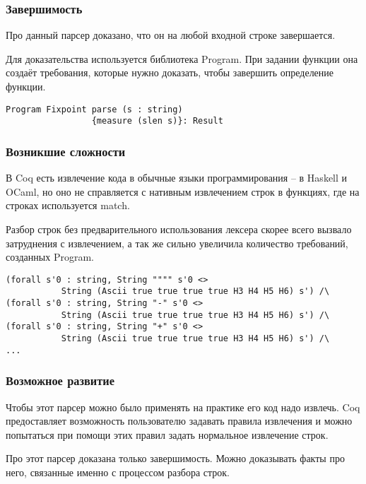 \documentclass[10pt,a4paper]{beamer}
\begin{document}
\begin{frame}[fragile]
\frametitle{Завершимость}

Про данный парсер доказано, что он на любой входной строке завершается.

Для доказательства используется библиотека Program. При задании функции она создаёт требования, которые нужно доказать, чтобы завершить определение функции.

\begin{lstlisting}
Program Fixpoint parse (s : string)
                 {measure (slen s)}: Result
\end{lstlisting}

\end{frame}

\begin{frame}[fragile]
\frametitle{Возникшие сложности}

В Coq есть извлечение кода в обычные языки программирования -- в Haskell и OCaml, но оно не справляется с нативным извлечением строк в функциях, где на строках используется match.

Разбор строк без предварительного использования лексера скорее всего вызвало затруднения с извлечением, а так же сильно увеличила количество требований, созданных Program.

\begin{lstlisting}[basicstyle=\footnotesize\ttfamily]
(forall s'0 : string, String """" s'0 <>
           String (Ascii true true true true H3 H4 H5 H6) s') /\
(forall s'0 : string, String "-" s'0 <>
           String (Ascii true true true true H3 H4 H5 H6) s') /\
(forall s'0 : string, String "+" s'0 <>
           String (Ascii true true true true H3 H4 H5 H6) s') /\
...

\end{lstlisting}
\end{frame}

\begin{frame}
\frametitle{Возможное развитие}

Чтобы этот парсер можно было применять на практике его код надо извлечь. Coq предоставляет возможность пользователю задавать правила извлечения и можно попытаться при помощи этих правил задать нормальное извлечение строк.

Про этот парсер доказана только завершимость. Можно доказывать факты про него, связанные именно с процессом разбора строк.

\end{frame}
\end{document}
